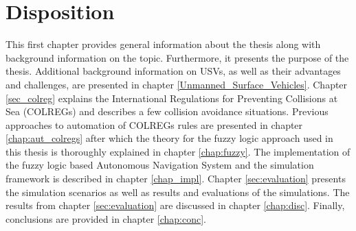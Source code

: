 \section{Disposition}
This first chapter  provides  general information about the thesis along with background information on the topic. Furthermore, it presents the purpose of the thesis. Additional background information on USVs, as well as their advantages and challenges, are presented in chapter \ref{Unmanned_Surface_Vehicles}. Chapter \ref{sec_colreg} explains the International Regulations for Preventing Collisions
at Sea (COLREGs) and describes a few collision avoidance situations.  Previous approaches to automation of COLREGs rules are presented in chapter \ref{chap:aut_colregs} after which the theory for the fuzzy logic approach used in this thesis is thoroughly explained in chapter \ref{chap:fuzzy}. The implementation of the fuzzy logic based Autonomous Navigation System and the simulation framework is described in chapter \ref{chap_impl}. Chapter \ref{sec:evaluation} presents the simulation scenarios as well as results and evaluations of the simulations. The results from chapter \ref{sec:evaluation} are discussed in chapter \ref{chap:disc}. Finally, conclusions are provided in chapter \ref{chap:conc}.